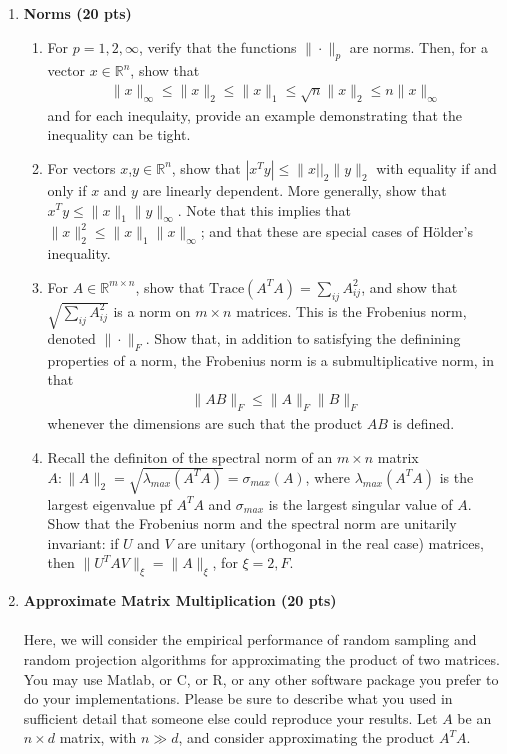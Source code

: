 \begin{enumerate}
{    }
    \item \textbf{Norms (20 pts)}
    \begin{enumerate}
        \item For $p=1,2,\infty$, verify that the functions $\|\cdot\|_p$ are norms. Then, for a vector $x \in \mathbb{R}^n$, show that
        \begin{align*}
            \|x\|_{\infty}\leq \| x\|_2\leq \|x\|_1\leq \sqrt{n}\|x\|_2\leq n \|x\|_{\infty}
        \end{align*}
        and for each inequlaity, provide an example demonstrating that the inequality can be tight.
        \item For vectors $x$,$y\in \mathbb{R}^n$, show that $|x^T y|\leq \|x||_2 \|y\|_2$ with equality if and only if $x$ and $y$ are linearly dependent. More generally, show that $x^T y\leq \|x\|_1 \|y\|_{\infty}$. Note that this implies that $\|x\|_2^2 \leq \|x\|_1 \|x\|_{\infty}$; and that these are special cases of H\"older's inequality.
        \item For $A\in \mathbb{R}^{m\times n}$, show that $\text{Trace}(A^T A)=\sum_{ij}A_{ij}^2$, and show that $\sqrt{\sum_{ij}A_{ij}^2}$ is a norm on $m \times n$ matrices. This is the Frobenius norm, denoted $\| \cdot\|_F$. Show that, in addition to satisfying the definining properties of  a norm, the Frobenius norm is a submultiplicative norm, in that
        \begin{align*}
            \|AB\|_F \leq \|A\|_F \|B\|_F
        \end{align*}
        whenever the dimensions are such that the product $AB$ is defined.
        \item Recall the definiton of the spectral norm of an $m\times n $ matrix $A: \|A\|_2= \sqrt{\lambda_{max}(A^T A)}=\sigma_{max}(A)$, where $\lambda_{max}(A^T A)$ is the largest eigenvalue pf $A^T A$ and $\sigma_{max}$ is the largest singular value of $A$. Show that the Frobenius norm and the spectral norm are unitarily invariant: if $U$ and $V$ are unitary (orthogonal in the real case) matrices, then $\|U^T A V\|_{\xi}=\|A\|_{\xi}$, for $\xi=2,F$.
    \end{enumerate}
    \solution{
    }
    \item \textbf{Approximate Matrix Multiplication (20 pts)}\\\\
    Here, we will consider the empirical performance of random sampling and random projection algorithms for approximating the product of two matrices. You may use Matlab, or C, or R, or any other software package you prefer to do your implementations. Please be sure to describe what you used in sufficient detail that someone else could reproduce your results. Let $A$ be an $n \times d$ matrix, with $n \gg d$, and consider approximating the product $A^T A$.

\end{enumerate}
